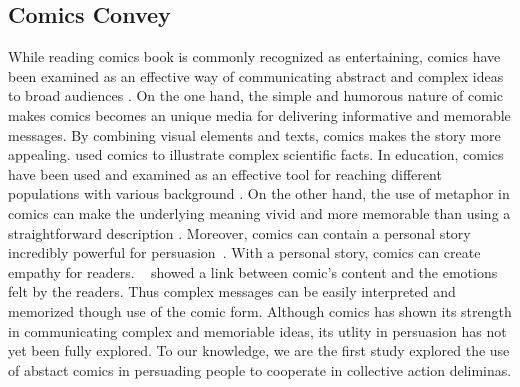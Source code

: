 \subsection{Comics Convey}
While reading comics book is commonly recognized as entertaining, comics have been examined as an effective way of communicating abstract and complex ideas to broad audiences \textcite{McDermottPB18,cary2004going,scott1993understanding}. On the one hand, the simple and humorous nature of comic makes comics becomes an unique media for delivering informative and memorable messages. By combining visual elements and texts, comics makes the story more appealing. \textcite{McDermottPB18} used comics to illustrate complex scientific facts. In education, comics have been used and examined as an effective tool for reaching different populations with various background \textcite{McDermottPB18,cary2004going,scott1993understanding}.  On the other hand, the use of metaphor in comics can make the underlying meaning vivid and more memorable than using a straightforward description \textcite{McDermottPB18,scott1993understanding}. Moreover, comics can contain a personal story incredibly powerful for persuasion~\textcite{weaver2017losing}. With a personal story, comics can create empathy for readers. ~\textcite{matsubara2016emotional} showed a link between comic's content and the emotions felt by the readers. Thus complex messages can be easily interpreted and memorized though use of the comic form. Although comics has shown its strength in communicating complex and memoriable ideas, its utlity in persuasion has not yet been fully explored. To our knowledge, we are the first study explored the use of abstact comics in persuading people to cooperate in collective action deliminas.  



